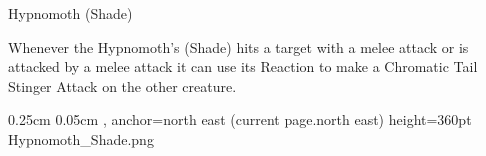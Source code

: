 \begin{DndMonster}[width=0.5\textwidth]{Hypnomoth (Shade)}
	\DndMonsterAttack[
		name=Chromatic Tail Stinger,
		distance=melee, %
		mod=+3,
		reach=5,
		targets=one target,
		dmg={\DndDice{1d4 + 3}},
		dmg-type=piercing,
	]
	
	Whenever the Hypnomoth's (Shade) hits a target with a melee attack or is attacked by a melee attack it can use its Reaction to make a Chromatic Tail Stinger Attack on the other creature.
\end{DndMonster}

\MonsterGraphicAndShortInfo[] %
{}%
{0.25cm}%
{0.05cm}%
{, anchor=north east}%
{(current page.north east)}%
{height=360pt}%
{Hypnomoth_Shade.png}%
%
\vspace*{-1.2\fontdimen6\font}
